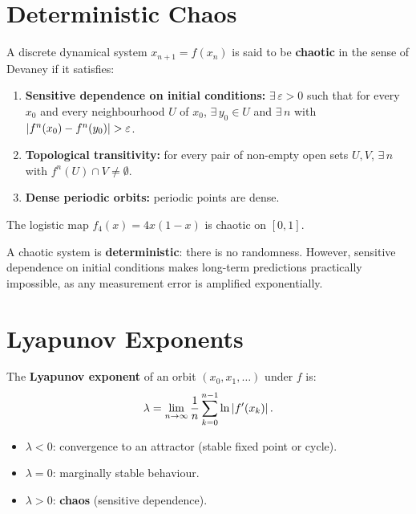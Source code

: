 \section{Deterministic Chaos}
\label{sec:chaos_def}

\begin{definition}
A discrete dynamical system $x_{n+1}=f(x_n)$ is said to be
\textbf{chaotic} in the sense of Devaney if it satisfies:
\begin{enumerate}
  \item \textbf{Sensitive dependence on initial conditions:}
    $\exists\,\varepsilon>0$ such that for every $x_0$ and every
    neighbourhood $U$ of $x_0$, $\exists\,y_0\in U$ and $\exists\,n$
    with $\abs{f^n(x_0)-f^n(y_0)}>\varepsilon$.
  \item \textbf{Topological transitivity:} for every pair of non-empty
    open sets $U,V$, $\exists\,n$ with $f^n(U)\cap V\neq\emptyset$.
  \item \textbf{Dense periodic orbits:} periodic points are dense.
\end{enumerate}
\end{definition}

\begin{theorem}
The logistic map $f_4(x)=4x(1-x)$ is chaotic on $[0,1]$.
\end{theorem}

\begin{intuition}[title=\textbf{Chaos and predictability}]
A chaotic system is \textbf{deterministic}: there is no randomness.
However, sensitive dependence on initial conditions makes long-term
predictions practically impossible, as any measurement error is
amplified exponentially.
\end{intuition}

\section{Lyapunov Exponents}
\label{sec:lyapunov}

\begin{definition}
The \textbf{Lyapunov exponent} of an orbit $(x_0,x_1,\ldots)$
under $f$ is:
\[
  \lambda = \lim_{n\to\infty}\frac{1}{n}\sum_{k=0}^{n-1}
  \ln\left| f'(x_k) \right|.
\]
\begin{itemize}
  \item $\lambda < 0$: convergence to an attractor (stable fixed point
    or cycle).
  \item $\lambda = 0$: marginally stable behaviour.
  \item $\lambda > 0$: \textbf{chaos} (sensitive dependence).
\end{itemize}
\end{definition}

